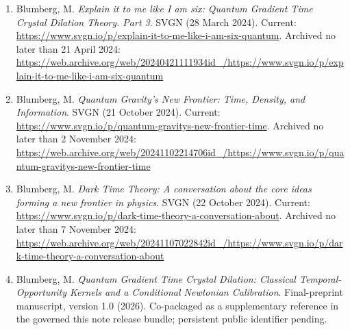\documentclass[
  american,
  11pt,
  letterpaper,
]{article}
\begin{document}
\begin{enumerate}
\item
  Blumberg, M. \emph{Explain it to me like I am six: Quantum Gradient Time Crystal Dilation Theory. Part 3}. SVGN (28 March 2024). Current: \url{https://www.svgn.io/p/explain-it-to-me-like-i-am-six-quantum}. Archived no later than 21 April 2024: \url{https://web.archive.org/web/20240421111934id_/https://www.svgn.io/p/explain-it-to-me-like-i-am-six-quantum}
\item
  Blumberg, M. \emph{Quantum Gravity's New Frontier: Time, Density, and Information}. SVGN (21 October 2024). Current: \url{https://www.svgn.io/p/quantum-gravitys-new-frontier-time}. Archived no later than 2 November 2024: \url{https://web.archive.org/web/20241102214706id_/https://www.svgn.io/p/quantum-gravitys-new-frontier-time}
\item
  Blumberg, M. \emph{Dark Time Theory: A conversation about the core ideas forming a new frontier in physics}. SVGN (22 October 2024). Current: \url{https://www.svgn.io/p/dark-time-theory-a-conversation-about}. Archived no later than 7 November 2024: \url{https://web.archive.org/web/20241107022842id_/https://www.svgn.io/p/dark-time-theory-a-conversation-about}
\item
  Blumberg, M. \emph{Quantum Gradient Time Crystal Dilation: Classical Temporal-Opportunity Kernels and a Conditional Newtonian Calibration}. Final-preprint manuscript, version 1.0 (2026). Co-packaged as a supplementary reference in the governed this note release bundle; persistent public identifier pending.
\end{enumerate}
\end{document}
